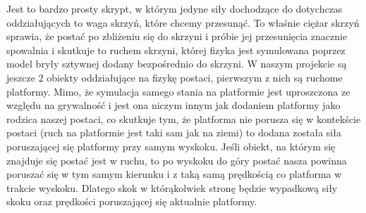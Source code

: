 \documentclass[oneside,polski,logo]{amuthesis}
\begin{document}
Jest to bardzo prosty skrypt, w którym jedyne siły dochodzące do dotychczas oddziałujących to waga skrzyń, które chcemy przesunąć. To właśnie ciężar skrzyń sprawia, że postać po zbliżeniu się do skrzyni i próbie jej przesunięcia znacznie spowalnia i skutkuje to ruchem skrzyni, której fizyka jest symulowana poprzez model bryły sztywnej dodany bezpośrednio do skrzyni.
W naszym projekcie są jeszcze 2 obiekty oddziałujące na fizykę postaci, pierwszym z nich są ruchome platformy. Mimo, że symulacja samego stania na platformie jest uproszczona ze względu na grywalność i jest ona niczym innym jak dodaniem platformy jako rodzica naszej postaci, co skutkuje tym, że platforma nie porusza się w kontekście postaci (ruch na platformie jest taki sam jak na ziemi) to dodana została siła poruszającej się platformy przy samym wyskoku. Jeśli obiekt, na którym się znajduje się postać jest w ruchu, to po wyskoku do góry postać nasza powinna poruszać się w tym samym kierunku i z taką samą prędkością co platforma w trakcie wyskoku. Dlatego skok w którąkolwiek stronę będzie wypadkową siły skoku oraz prędkości poruszającej się aktualnie platformy.
\end{document}

